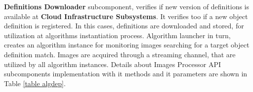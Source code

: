 \textbf{Definitions Downloader} subcomponent, verifies if new version of definitions is available at \textbf{Cloud Infrastructure Subsystems}. It verifies too if a new object definition is registered. In this cases, definitions are downloaded and stored, for utilization at algorithms instantiation process. 
%
%
%
%
%
Algorithm launcher in turn, creates an algorithm instance for monitoring images searching for a target object definition match. Images are acquired through a streaming channel, that are utilized by all algorithm instances. Details about Images Processor API subcomponents implementation with it methods and it parameters are shown in Table \ref{table algdep}.
%
%
%
% 
% 
\begin{center}
  \label{table algdep} %
  \begin{tabular}{|c|c|c|c|c|c|}
  \end{tabular}
\end{center}
\tabulinesep=2.0mm

